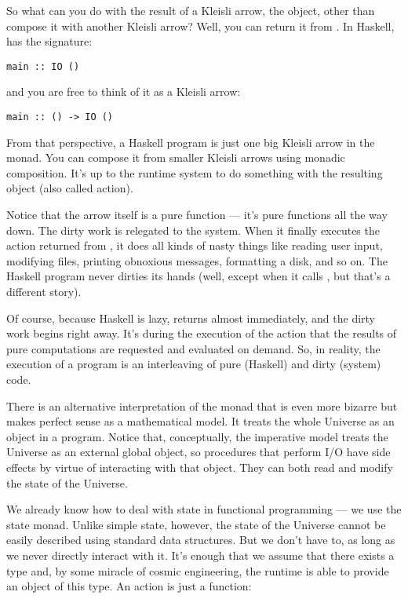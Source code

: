 So what can you do with the result of a Kleisli arrow, the 
object, other than compose it with another Kleisli arrow? Well, you can
return it from . In Haskell,  has the
signature:

\begin{Verbatim}[commandchars=\\\{\}]
main :: IO ()
\end{Verbatim}
and you are free to think of it as a Kleisli arrow:

\begin{Verbatim}[commandchars=\\\{\}]
main :: () -> IO ()
\end{Verbatim}
From that perspective, a Haskell program is just one big Kleisli arrow
in the  monad. You can compose it from smaller Kleisli arrows
using monadic composition. It's up to the runtime system to do something
with the resulting  object (also called  action).

Notice that the arrow itself is a pure function --- it's pure functions
all the way down. The dirty work is relegated to the system. When it
finally executes the  action returned from , it
does all kinds of nasty things like reading user input, modifying files,
printing obnoxious messages, formatting a disk, and so on. The Haskell
program never dirties its hands (well, except when it calls
, but that's a different story).

Of course, because Haskell is lazy,  returns almost
immediately, and the dirty work begins right away. It's during the
execution of the  action that the results of pure
computations are requested and evaluated on demand. So, in reality, the
execution of a program is an interleaving of pure (Haskell) and dirty
(system) code.

There is an alternative interpretation of the  monad that is
even more bizarre but makes perfect sense as a mathematical model. It
treats the whole Universe as an object in a program. Notice that,
conceptually, the imperative model treats the Universe as an external
global object, so procedures that perform I/O have side effects by
virtue of interacting with that object. They can both read and modify
the state of the Universe.

We already know how to deal with state in functional programming --- we
use the state monad. Unlike simple state, however, the state of the
Universe cannot be easily described using standard data structures. But
we don't have to, as long as we never directly interact with it. It's
enough that we assume that there exists a type  and,
by some miracle of cosmic engineering, the runtime is able to provide an
object of this type. An  action is just a function:

